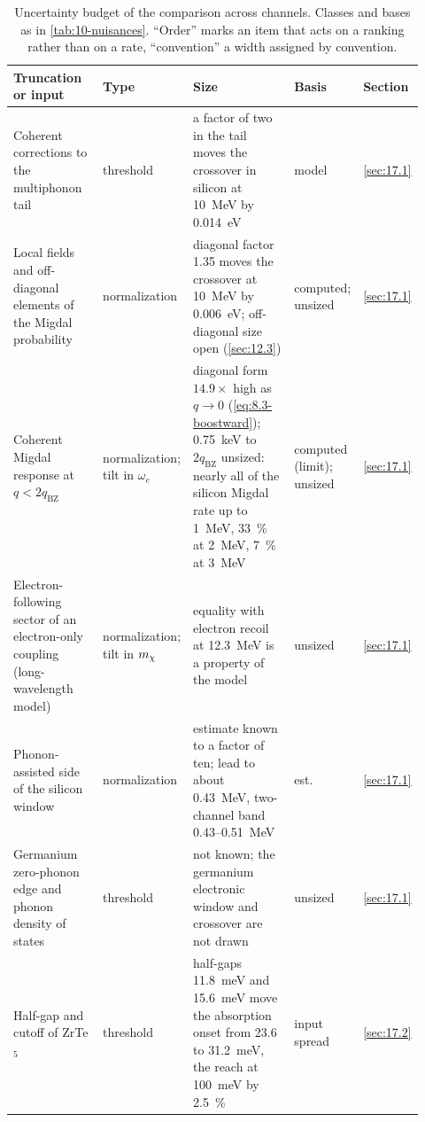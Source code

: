 \begin{table}[tbp]
  \caption{Uncertainty budget of the comparison across channels. Classes and bases as in \cref{tab:10-nuisances}. ``Order'' marks an item that acts on a ranking rather than on a rate, ``convention'' a width assigned by convention.}
  \label{tab:17-nuisances}
  \centering\scriptsize\setlength{\tabcolsep}{3pt}
  \begin{tabular}{@{}>{\raggedright\arraybackslash}p{0.26\linewidth}>{\raggedright\arraybackslash}p{0.12\linewidth}>{\raggedright\arraybackslash}p{0.35\linewidth}>{\raggedright\arraybackslash}p{0.09\linewidth}>{\raggedright\arraybackslash}p{0.10\linewidth}@{}}
    \toprule
    Truncation or input & Type & Size & Basis & Section \\
    \midrule
    Coherent corrections to the multiphonon tail & threshold & a factor of two in the tail moves the crossover in silicon at \SI{10}{MeV} by \SI{0.014}{eV} & model & \cref{sec:17.1} \\
    Local fields and off-diagonal elements of the Migdal probability & normali\-zation & diagonal factor 1.35 moves the crossover at \SI{10}{MeV} by \SI{0.006}{eV}; off-diagonal size open (\cref{sec:12.3}) & computed; unsized & \cref{sec:17.1} \\
    Coherent Migdal response at $q < 2q_{\mathrm{BZ}}$ & normali\-zation; tilt in $\omega_e$ & diagonal form $14.9\times$ high as $q \to 0$ (\cref{eq:8.3-boostward}); \SI{0.75}{keV} to $2q_{\mathrm{BZ}}$ unsized: nearly all of the silicon Migdal rate up to \SI{1}{MeV}, \SI{33}{\percent} at \SI{2}{MeV}, \SI{7}{\percent} at \SI{3}{MeV} & computed (limit); unsized & \cref{sec:17.1} \\
    Electron-following sector of an electron-only coupling (long-wavelength model) & normali\-zation; tilt in $m_{\chi}$ & equality with electron recoil at \SI{12.3}{MeV} is a property of the model & unsized & \cref{sec:17.1} \\
    Phonon-assisted side of the silicon window & normali\-zation & estimate known to a factor of ten; lead to about \SI{0.43}{MeV}, two-channel band 0.43--\SI{0.51}{MeV} & est. & \cref{sec:17.1} \\
    Germanium zero-phonon edge and phonon density of states & threshold & not known; the germanium electronic window and crossover are not drawn & unsized & \cref{sec:17.1} \\
    Half-gap and cutoff of ZrTe$_5$ & threshold & half-gaps \SI{11.8}{meV} and \SI{15.6}{meV} move the absorption onset from 23.6 to \SI{31.2}{meV}, the reach at \SI{100}{meV} by \SI{2.5}{\percent} & input spread & \cref{sec:17.2} \\

\end{tabular}
\end{table}
